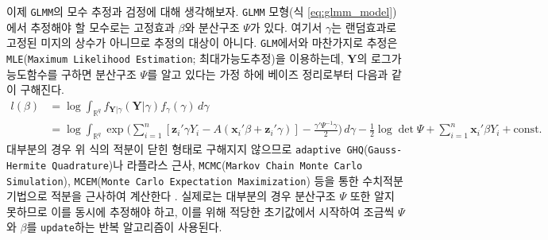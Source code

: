 \documentclass[10pt,onecolumn,twoside,a4size]{gsag3jnl}
\begin{document}
이제 \texttt{GLMM}의 모수 추정과 검정에 대해 생각해보자. \texttt{GLMM} 모형(식 \ref{eq:glmm_model})에서 추정해야 할 모수로는 고정효과 $\beta$와 분산구조 $\Psi$가 있다. 여기서 $\gamma$는 랜덤효과로 고정된 미지의 상수가 아니므로 추정의 대상이 아니다. \texttt{GLM}에서와 마찬가지로 추정은 \texttt{MLE}(\texttt{Maximum Likelihood Estimation}; 최대가능도추정)을 이용하는데, $\mathbf{Y}$의 로그가능도함수를 구하면 분산구조 $\Psi$를 알고 있다는 가정 하에 베이즈 정리로부터 다음과 같이 구해진다.
\begin{align}
  l(\beta)&=\log\int_{\mathbb{R}^q}f_{\mathbf{Y}\vert\gamma}(\mathbf{Y}\vert\gamma)f_\gamma(\gamma)\,d\gamma\\
  &=\log\int_{\mathbb{R}^q}\exp\bigg(\sum_{i=1}^n[\mathbf{z}_i'\gamma Y_i-A(\mathbf{x}_i'\beta+\mathbf{z}_i'\gamma)]-\frac{\gamma'\Psi^{-1}\gamma}{2}\bigg)\,d\gamma-\frac{1}{2}\log\det\Psi+\sum_{i=1}^n\mathbf{x}_i'\beta Y_i+\mathrm{const.}\nonumber
\end{align}
대부분의 경우 위 식의 적분이 닫힌 형태로 구해지지 않으므로 \texttt{adaptive GHQ}(\texttt{Gauss-Hermite Quadrature})나 라플라스 근사, \texttt{MCMC}(\texttt{Markov Chain Monte Carlo Simulation}), \texttt{MCEM}(\texttt{Monte Carlo Expectation Maximization}) 등을 통한 수치적분 기법으로 적분을 근사하여 계산한다 \texttt{\citep{capanu2013assessment}}. 실제로는 대부분의 경우 분산구조 $\Psi$ 또한 알지 못하므로 이를 동시에 추정해야 하고, 이를 위해 적당한 초기값에서 시작하여 조금씩 $\Psi$와 $\beta$를 \texttt{update}하는 반복 알고리즘이 사용된다.
\end{document}
